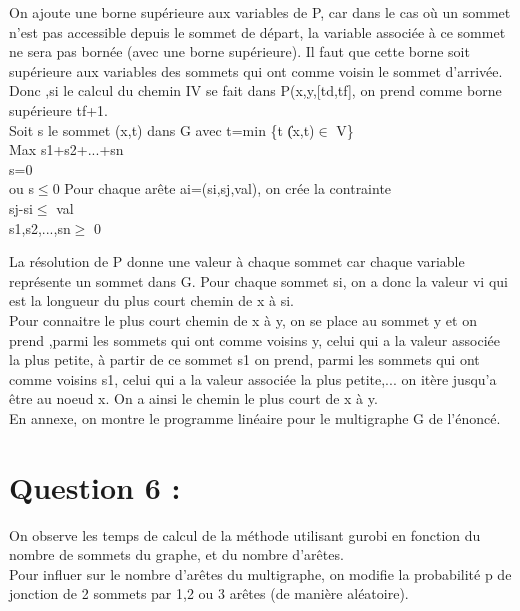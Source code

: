 \documentclass{article}
\begin{document}
On ajoute une borne supérieure aux variables de P, car dans le cas où un sommet n'est pas accessible depuis le sommet de départ, la variable associée à ce sommet ne sera pas bornée (avec une borne supérieure). Il faut que cette borne soit supérieure aux variables des sommets qui ont comme voisin le sommet d'arrivée. Donc ,si le calcul du chemin IV se fait dans P(x,y,[td,tf], on prend comme borne supérieure tf+1.\\

Soit s le sommet (x,t) dans \tild G avec t=min \{t \| (x,t)$ \in $ \tild V\}\\

Max s1+s2+...+sn\\

s=0\\ ou s$ \leq $0
Pour chaque arête ai=(si,sj,val), on crée la contrainte\\
sj-si$ \leq $ val\\

s1,s2,...,sn$ \geq $ 0

La résolution de P donne une valeur à chaque sommet car chaque variable représente un sommet dans \tild G. Pour chaque sommet si, on a donc la valeur vi qui est la longueur du plus court chemin de x à si.\\
Pour connaitre le plus court chemin de x à y, on se place au sommet y et on prend ,parmi les sommets qui ont comme voisins y, celui qui a la valeur associée la plus petite, à partir de ce sommet s1 on prend, parmi les sommets qui ont comme voisins s1, celui qui a la valeur associée la plus petite,... on itère jusqu'a être au noeud x. On a ainsi le chemin le plus court de x à y.\\

En annexe, on montre le programme linéaire pour le multigraphe G de l'énoncé.

\section*{Question 6 :}
On observe les temps de calcul de la méthode utilisant gurobi en fonction du nombre de sommets du graphe, et du nombre d'arêtes.\\Pour influer sur le nombre d'arêtes du multigraphe, on modifie la probabilité p de jonction de 2 sommets par 1,2 ou 3 arêtes (de manière aléatoire).\\ 
\end{document}

